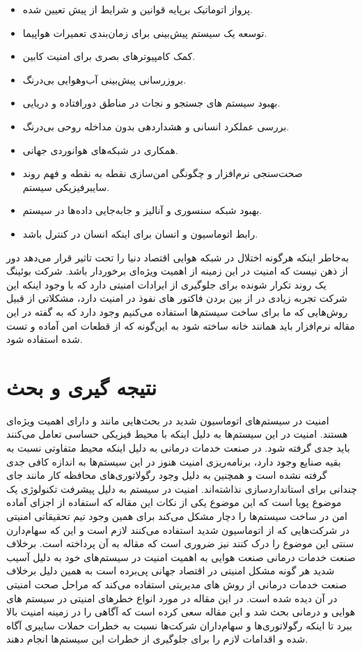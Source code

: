 \documentclass[a4paper, 11pt]{article}
\begin{document}
\begin{itemize}
    \item پرواز اتوماتیک برپایه قوانین و شرایط از پیش تعیین شده.
    \item توسعه یک سیستم پیش‌بینی برای زمان‌بندی تعمیرات هواپیما.
    \item کمک کامپیوتر‌های بصری برای امنیت کابین.
    \item بروزرسانی پیش‌بینی آب‌وهوایی بی‌درنگ.
    \item بهبود سیستم های جستجو و نجات در مناطق دورافتاده و دریایی.
    \item بررسی عملکرد انسانی و هشداردهی بدون مداخله روحی بی‌درنگ.
    \item همکاری در شبکه‌های هوانوردی جهانی.
    \item صحت‌سنجی نرم‌افزار و چگونگی امن‌سازی نقطه‌ به نقطه و فهم روند سایبرفیزیکی سیستم.
    \item بهبود شبکه سنسوری و آنالیز و جابه‌جایی داده‌ها در سیستم.
    \item رابط اتوماسیون و انسان برای اینکه انسان در کنترل باشد.
\end{itemize}
به‌خاطر اینکه هرگونه اختلال در شبکه هوایی اقتصاد دنیا را تحت تاثیر قرار می‌دهد دور از ذهن نیست که
امنیت در این زمینه از اهمیت ویژه‌ای برخوردار باشد.
شرکت بوئینگ یک روند تکرار شونده برای جلوگیری از ایرادات امنیتی دارد که با وجود اینکه این شرکت تجربه
زیادی در از بین بردن فاکتور های نفوذ در امنیت دارد، مشکلاتی از قبیل روش‌هایی که ما برای ساخت
سیستم‌ها استفاده می‌کنیم وجود دارد که به گفته
در این مقاله نرم‌افزار باید همانند خانه ساخته شود به این‌گونه که از قطعات امن آماده و تست شده
استفاده شود.
\section{نتیجه گیری و بحث}
امنیت در سیستم‌های اتوماسیون شدید در بحث‌هایی مانند
و
دارای اهمیت ویژه‌ای هستند. امنیت در این سیستم‌ها به دلیل اینکه با محیط فیزیکی حساسی تعامل
می‌کنند باید جدی گرفته شود. در صنعت خدمات درمانی به دلیل اینکه محیط متفاوتی نسبت به
بقیه صنایع وجود دارد، برنامه‌ریزی امنیت هنوز در این سیستم‌ها به اندازه کافی جدی گرفته نشده است و
همچنین به دلیل وجود رگولاتوری‌های محافظه کار مانند
جای چندانی برای استاندارد‌سازی نذاشته‌اند. امنیت در سیستم به دلیل پیشرفت تکنولوژی یک موضوع پویا
است که این موضوع یکی از نکات این مقاله که استفاده از اجزای آماده امن در ساخت سیستم‌ها
را دچار مشکل می‌کند برای همین وجود تیم تحقیقاتی امنیتی در شرکت‌هایی که از اتوماسیون شدید استفاده
می‌کنند لازم است و این که سهام‌دارن سنتی این موضوع را درک کنند نیز ضروری است که مقاله به آن
پرداخته است.
برخلاف صنعت خدمات درمانی صنعت هوایی به اهمیت امنیت در سیستم‌های خود به دلیل آسیب شدید
هر گونه مشکل امنیتی در اقتصاد جهانی پی‌برده است به همین دلیل برخلاف صنعت خدمات درمانی
از روش های مدیریتی استفاده می‌کند که مراحل صحت امنیتی در آن دیده شده است.
در این مقاله در مورد انواع خطر‌های امنیتی در سیستم های هوایی و درمانی بحث شد و این مقاله
سعی کرده است که آگاهی را در زمینه امنیت بالا ببرد تا اینکه رگولاتوری‌ها و سهام‌داران شرکت‌ها
نسبت به خطرات حملات سایبری آگاه شده و اقدامات لازم را برای جلوگیری از خطرات این سیستم‌ها
انجام دهند.


\end{document}
